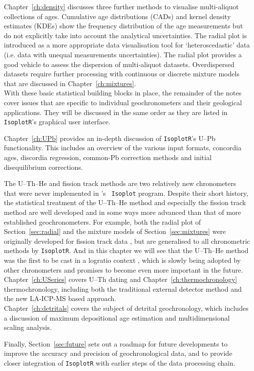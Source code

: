 Chapter~\ref{ch:density} discusses three further methods to visualise
multi-aliquot collections of ages. Cumulative age distributions (CADs)
and kernel density estimates (KDEs) show the frequency distribution of
the age measurements but do not explicitly take into account the
analytical uncertainties. The radial plot is introduced as a more
appropriate data visualisation tool for `heteroscedastic' data
(i.e. data with unequal measurements uncertainties). The radial plot
provides a good vehicle to assess the dispersion of multi-aliquot
datasets. Overdispersed datasets require further processing with
continuous or discrete mixture models that are discussed in
Chapter~\ref{ch:mixtures}.\\

With these basic statistical building blocks in place, the remainder
of the notes cover issues that are specific to individual
geochronometers and their geological applications. They will be
discussed in the same order as they are listed in \texttt{IsoplotR}'s
graphical user interface.

Chapter~\ref{ch:UPb} provides an in-depth discussion of
\texttt{IsoplotR}'s U--Pb functionality. This includes an overview of
the various input formats, concordia ages, discordia regression,
common-Pb correction methods and initial disequilibrium corrections.

The U--Th--He and fission track methods are two relatively new
chronometers that were never implemented in \citet{ludwig2003}'s
~\texttt{Isoplot} program.  Despite their short history, the
statistical treatment of the U--Th--He method and especially the
fission track method are well developed and in some ways more advanced
than that of more established geochronometers. For example, both the
radial plot of Section~\ref{sec:radial} and the mixture models of
Section~\ref{sec:mixtures} were originally developed for fission track
data \citep{galbraith1990a,galbraith1990b}, but are generalised to all
chronometric methods by \texttt{IsoplotR}. And in this chapter we will
see that the U--Th--He method was the first to be cast in a logratio
context \citep{vermeesch2010a}, which is slowly being adopted by other
chronometers and promises to become even more important in the future.\\

Chapter~\ref{ch:USeries} covers U--Th dating and
Chapter~\ref{ch:thermochronology} thermochronology, including both the
traditional external detector method and the new LA-ICP-MS based
approach.\\

Chapter~\ref{ch:detritals} covers the subject of detrital
geochronology, which includes a discussion of maximum depositional age
estimation and multidimensional scaling analysis.


Finally, Section~\ref{sec:future} sets out a roadmap for future
developments to improve the accuracy and precision of geochronological
data, and to provide closer integration of \texttt{IsoplotR} with
earlier steps of the data processing chain.
